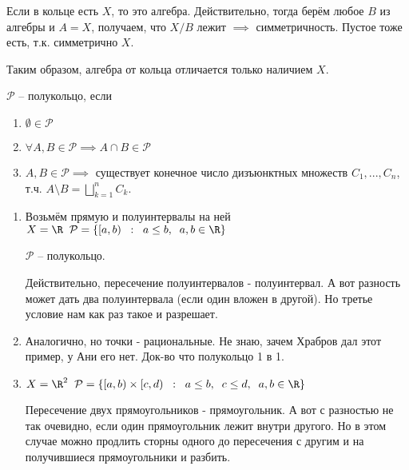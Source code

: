 \begin{remark}\thmslashn
	
	Если в кольце есть $X$, то это алгебра. Действительно, тогда берём любое $B$ из алгебры и $A=X$, получаем, что $X/B$ лежит $\implies$ симметричность. Пустое тоже есть, т.к. симметрично $X$.

	
\end{remark}

Таким образом, алгебра от кольца отличается только наличием $X$.


\begin{definition}\thmslashn
	
	$\mathcal{P}$ -- полукольцо, если 
	
	\begin{enumerate}
		\item $\emptyset \in \mathcal{P}$
		
		\item $\forall A,B \in \mathcal{P} \implies A\cap B \in \mathcal{P}$
		
		\item $A, B \in \mathcal{P} \implies$ существует конечное число дизъюнктных множеств $C_1,...,C_n$, т.ч. $A\setminus B = \bigsqcup\limits_{k=1}^{n} C_k$.
	\end{enumerate}
	
	
\end{definition}

\begin{example}\thmslashn
	
	\begin{enumerate}
		\item 
		Возьмём прямую и полуинтервалы на ней
		$X = \R \;\; \mathcal{P} = \{[a,b) \;\;:\;\; a\le b,\;\;a,b \in \R\}$
	
		$\mathcal{P}$ -- полукольцо.

		Действительно, пересечение полуинтервалов - полуинтервал. А вот разность может дать два полуинтервала (если один вложен в другой). Но третье условие нам как раз такое и разрешает.

		\item 
			Аналогично, но точки - рациональные. Не знаю, зачем Храбров дал этот пример, у Ани его нет. Док-во что полукольцо 1 в 1.
		\item 
			$X = \R^2 \;\; \mathcal{P} = \{[a,b)\times [c,d) \;\;:\;\; a\le b,\;\; c\le d,\;\; a,b \in \R\}$
			
			Пересечение двух прямоугольников - прямоугольник. А вот с разностью не так очевидно, если один прямоугольник лежит внутри другого. Но в этом случае можно продлить сторны одного до пересечения с другим и на получившиеся прямоугольники и разбить.

	\end{enumerate}
\end{example}

